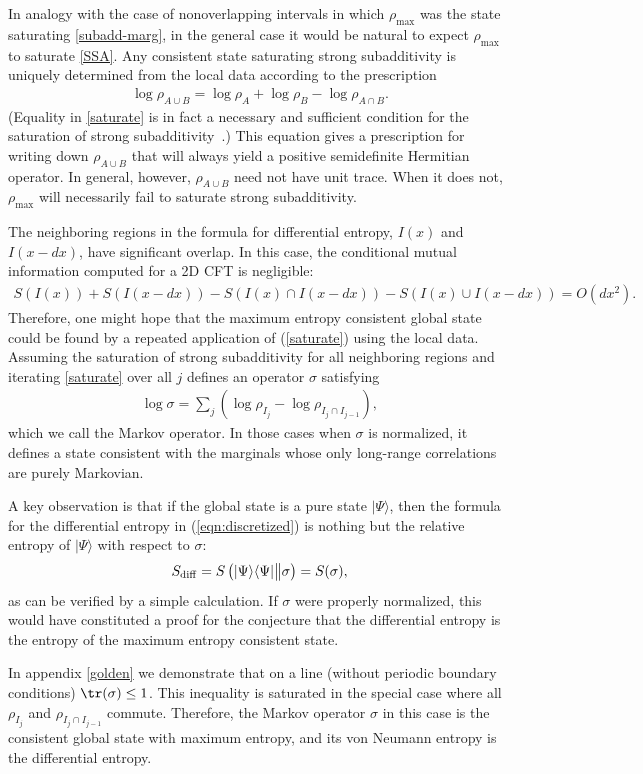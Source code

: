 \documentclass[12pt]{article}
\newcommand{\la}{\langle}
\newcommand{\ra}{\rangle}
\newcommand{\rb}{\right)}
\newcommand{\lb}{\left(}
\def\bea{\begin{eqnarray}}
\def\eea{\end{eqnarray}}
\def\sdiff{S_{\rm diff}}
\begin{document}
In analogy with the case of nonoverlapping intervals in which $\rho_{\max}$ was the state saturating \eqref{subadd-marg}, in the general case it would be natural to expect $\rho_{\max}$ to saturate \eqref{SSA}. Any consistent state saturating strong subadditivity is uniquely determined from the local data according to the prescription
 \bea\label{saturate}
 \log \rho_{A\cup B}=\log \rho_A+\log \rho_B-\log \rho_{A\cap B}.
 \eea
(Equality in \eqref{saturate} is in fact a necessary and sufficient condition for the saturation of strong subadditivity~\cite{ruskai}.) This equation gives a prescription for writing down $\rho_{A \cup B}$ that will always yield a positive semidefinite Hermitian operator. In general, however, $\rho_{A \cup B}$ need not have unit trace. When it does not, $\rho_{\max}$ will necessarily fail to saturate strong subadditivity.


The neighboring regions in the formula for differential entropy, $I(x)$ and $I(x-dx)$, have significant overlap. In this case, the conditional mutual information computed for a 2D CFT is negligible:
\bea
S(I(x))+S(I(x-dx))-S(I(x)\cap I(x-dx))-S(I(x)\cup I(x-dx))= O(dx^2).
\eea
Therefore, one might hope that the maximum entropy consistent global state could be found by a repeated application of (\ref{saturate}) using the local data. Assuming the saturation of strong subadditivity for all neighboring regions and iterating \eqref{saturate} over all $j$ defines an operator $\sigma$ satisfying
\bea\label{rho_global}
\log\sigma=\sum_j\lb \log\rho_{I_j}-\log\rho_{I_j\cap I_{j-1}}\rb,
\eea
which we call the Markov operator. In those cases when $\sigma$ is normalized, it defines a state consistent with the marginals whose only long-range correlations are purely Markovian.

A key observation is that if the global state is a pure state $|\Psi\ra$, then the formula for the differential entropy in (\ref{eqn:discretized}) is nothing but the relative entropy of $|\Psi\ra$ with respect to $\sigma$:
\bea
\sdiff=S\left(|\Psi\ra\la\Psi|\big\|\sigma\right)=S(\sigma),
\eea
as can be verified by a simple calculation.
If $\sigma$ were properly normalized, this would have constituted a proof for the conjecture that the differential entropy is the entropy of the maximum entropy consistent state.

In appendix \ref{golden} we demonstrate that on a line (without periodic boundary conditions) $\tr(\sigma)\leq 1$. This inequality is saturated in the special case where all $\rho_{I_j}$ and $\rho_{{I_j}\cap I_{j-1}}$ commute. Therefore, the Markov operator $\sigma$ in this case is the consistent global state with maximum entropy, and its von Neumann entropy is the differential entropy.
\end{document}
